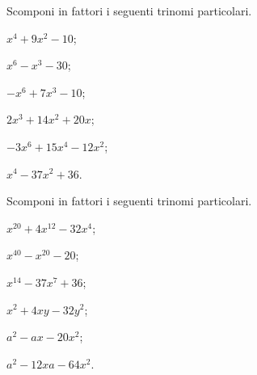 \begin{esercizio}
 \label{ese:13.62}
 Scomponi in fattori i seguenti trinomi particolari.
 \begin{multicols}{3}
 \begin{enumeratea}
 \item $x^{4}+9x^{2}-10$;
 \item $x^{6}-x^{3}-30$;
 \item $-x^{6}+7x^{3}-10$;
 \item $2x^{3}+14x^{2}+20x$;
 \item $-3x^{6}+15x^{4}-12x^{2}$;
 \item $x^{4}-37x^{2}+36$.
 \end{enumeratea}
\end{multicols}
\end{esercizio}

\begin{esercizio}
 \label{ese:13.63}
 Scomponi in fattori i seguenti trinomi particolari.
 \begin{multicols}{3}
 \begin{enumeratea}
 \item $x^{20}+4x^{12}-32x^{4}$;
 \item $x^{40}-x^{20}-20$;
 \item $x^{14}-37x^{7}+36$;
 \item $x^{2}+4xy-32y^{2}$;
 \item $a^{2}-ax-20x^{2}$;
 \item $a^{2}-12xa-64x^{2}$.
 \end{enumeratea}
\end{multicols}
\end{esercizio}

